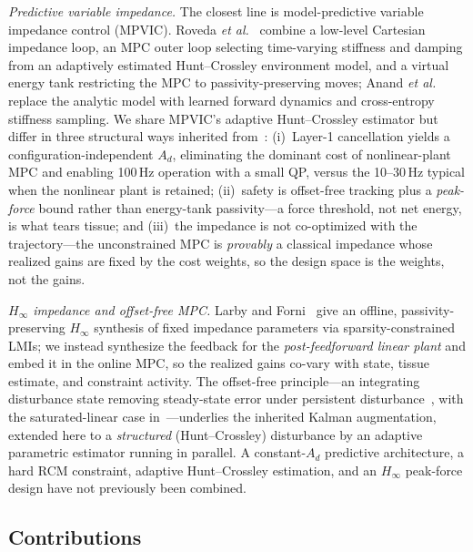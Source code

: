 \emph{Predictive variable impedance.} The closest line is model-predictive variable impedance control (MPVIC). Roveda \emph{et al.}~\cite{roveda2025} combine a low-level Cartesian impedance loop, an MPC outer loop selecting time-varying stiffness and damping from an adaptively estimated Hunt--Crossley environment model, and a virtual energy tank restricting the MPC to passivity-preserving moves; Anand \emph{et al.}~\cite{anand2022} replace the analytic model with learned forward dynamics and cross-entropy stiffness sampling. We share MPVIC's adaptive Hunt--Crossley estimator but differ in three structural ways inherited from~\cite{cao2026phri}: (i)~Layer-1 cancellation yields a configuration-independent $A_d$, eliminating the dominant cost of nonlinear-plant MPC and enabling 100\,Hz operation with a small QP, versus the 10--30\,Hz typical when the nonlinear plant is retained; (ii)~safety is offset-free tracking plus a \emph{peak-force} bound rather than energy-tank passivity---a force threshold, not net energy, is what tears tissue; and (iii)~the impedance is not co-optimized with the trajectory---the unconstrained MPC is \emph{provably} a classical impedance whose realized gains are fixed by the cost weights, so the design space is the weights, not the gains.

\emph{$H_\infty$ impedance and offset-free MPC.} Larby and Forni~\cite{larby2022} give an offline, passivity-preserving $H_\infty$ synthesis of fixed impedance parameters via sparsity-constrained LMIs; we instead synthesize the feedback for the \emph{post-feedforward linear plant} and embed it in the online MPC, so the realized gains co-vary with state, tissue estimate, and constraint activity. The offset-free principle---an integrating disturbance state removing steady-state error under persistent disturbance~\cite{pannocchia2003,rawlings2017}, with the saturated-linear case in~\cite{cao2004antiwindup}---underlies the inherited Kalman augmentation, extended here to a \emph{structured} (Hunt--Crossley) disturbance by an adaptive parametric estimator running in parallel. A constant-$A_d$ predictive architecture, a hard RCM constraint, adaptive Hunt--Crossley estimation, and an $H_\infty$ peak-force design have not previously been combined.

\subsection{Contributions}

